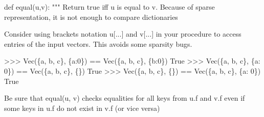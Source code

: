 \documentclass[
  letterpaper,
  DIV=11,
  numbers=noendperiod]{scrartcl}
\newenvironment{Shaded}{\begin{snugshade}}{\end{snugshade}}
\newcommand{\CommentTok}[1]{\textcolor[rgb]{0.37,0.37,0.37}{#1}}
\newcommand{\KeywordTok}[1]{\textcolor[rgb]{0.00,0.23,0.31}{#1}}
\newcommand{\NormalTok}[1]{\textcolor[rgb]{0.00,0.23,0.31}{#1}}
\begin{document}
\begin{Shaded}
\begin{Highlighting}[numbers=left,,]
\KeywordTok{def}\NormalTok{ equal(u,v):}
    \CommentTok{"""}
\CommentTok{    Return true iff u is equal to v.}
\CommentTok{    Because of sparse representation, it is not enough to compare dictionaries}

\CommentTok{    Consider using brackets notation u[...] and v[...] in your procedure}
\CommentTok{    to access entries of the input vectors.  This avoids some sparsity bugs.}

\CommentTok{    \textgreater{}\textgreater{}\textgreater{} Vec(\{\textquotesingle{}a\textquotesingle{}, \textquotesingle{}b\textquotesingle{}, \textquotesingle{}c\textquotesingle{}\}, \{\textquotesingle{}a\textquotesingle{}:0\}) == Vec(\{\textquotesingle{}a\textquotesingle{}, \textquotesingle{}b\textquotesingle{}, \textquotesingle{}c\textquotesingle{}\}, \{\textquotesingle{}b\textquotesingle{}:0\})}
\CommentTok{    True}
\CommentTok{    \textgreater{}\textgreater{}\textgreater{} Vec(\{\textquotesingle{}a\textquotesingle{}, \textquotesingle{}b\textquotesingle{}, \textquotesingle{}c\textquotesingle{}\}, \{\textquotesingle{}a\textquotesingle{}: 0\}) == Vec(\{\textquotesingle{}a\textquotesingle{}, \textquotesingle{}b\textquotesingle{}, \textquotesingle{}c\textquotesingle{}\}, \{\})}
\CommentTok{    True}
\CommentTok{    \textgreater{}\textgreater{}\textgreater{} Vec(\{\textquotesingle{}a\textquotesingle{}, \textquotesingle{}b\textquotesingle{}, \textquotesingle{}c\textquotesingle{}\}, \{\}) == Vec(\{\textquotesingle{}a\textquotesingle{}, \textquotesingle{}b\textquotesingle{}, \textquotesingle{}c\textquotesingle{}\}, \{\textquotesingle{}a\textquotesingle{}: 0\})}
\CommentTok{    True}

\CommentTok{    Be sure that equal(u, v) checks equalities for all keys from u.f and v.f even if}
\CommentTok{    some keys in u.f do not exist in v.f (or vice versa)}


\end{Highlighting}
\end{Shaded}
\end{document}
